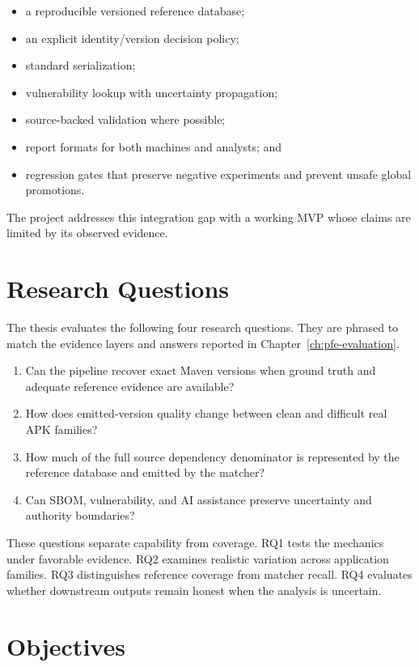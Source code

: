 \begin{itemize}
  \item a reproducible versioned reference database;
  \item an explicit identity/version decision policy;
  \item standard \SBOM serialization;
  \item vulnerability lookup with uncertainty propagation;
  \item source-backed validation where possible;
  \item report formats for both machines and analysts; and
  \item regression gates that preserve negative experiments and prevent
  unsafe global promotions.
\end{itemize}

The project addresses this integration gap with a working MVP whose claims are
limited by its observed evidence.

\section{Research Questions}

The thesis evaluates the following four research questions. They are phrased
to match the evidence layers and answers reported in
Chapter~\ref{ch:pfe-evaluation}.

\begin{enumerate}[label=\textbf{RQ\arabic*:}]
  \item Can the pipeline recover exact Maven versions when ground truth and
  adequate reference evidence are available?
  \item How does emitted-version quality change between clean and difficult
  real APK families?
  \item How much of the full source dependency denominator is represented by
  the reference database and emitted by the matcher?
  \item Can SBOM, vulnerability, and AI assistance preserve uncertainty and
  authority boundaries?
\end{enumerate}

These questions separate capability from coverage. RQ1 tests the mechanics
under favorable evidence. RQ2 examines realistic variation across application
families. RQ3 distinguishes reference coverage from matcher recall. RQ4
evaluates whether downstream outputs remain honest when the analysis is
uncertain.

\section{Objectives}

